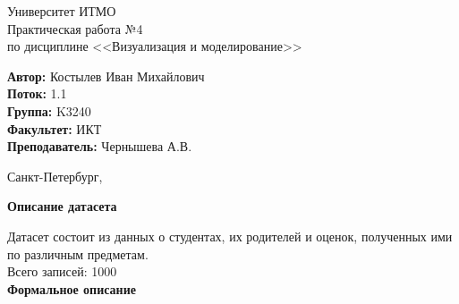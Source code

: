 \documentclass[12pt,a4paper]{article}
\begin{document}
	
\begin{titlepage}
	
\begin{center}
	\large Университет ИТМО\\[5cm]
	\LARGE Практическая работа №4\\
	\normalsize по дисциплине <<Визуализация и моделирование>>\\[5cm]
\end{center}
\begin{flushright}
		\begin{minipage}{0.6\textwidth}
		\begin{flushleft}
			\large
			\singlespacing 
			\textbf{Автор:} Костылев Иван Михайлович\\
			\textbf{Поток:} 1.1\\
			\textbf{Группа:} K3240\\
			\textbf{Факультет:} ИКТ\\
			\textbf{Преподаватель:} Чернышева А.В.
		\end{flushleft}
	\end{minipage}
\end{flushright}

\vfill

\begin{center}
	{\large Санкт-Петербург, \the{}}
\end{center}
 
\end{titlepage}
\normalsize


\large \textbf{Описание датасета}

\normalsize
	Датасет состоит из данных о студентах, их родителей и оценок, полученных ими по различным предметам. \\

Всего записей: 1000 \\


\large \textbf{Формальное описание}
\end{document}
